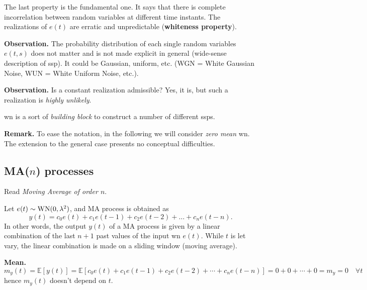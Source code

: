 The last property is the fundamental one. It says that there is complete incorrelation between random variables at different time instants. The realizations of $e(t)$ are erratic and unpredictable (\textbf{whiteness property}).


\textbf{Observation.} The probability distribution of each single random variables $e(t,s)$ does not matter and is not made explicit in general (wide-sense description of \gls{ssp}).
It could be Gaussian, uniform, etc. (WGN = White Gaussian Noise, WUN = White Uniform Noise, etc.).

\textbf{Observation.} Is a constant realization admissible? Yes, it is, but such a realization is \emph{highly unlikely}.

\gls{wn} is a sort of \emph{building block} to construct a number of different \glspl{ssp}.

\textbf{Remark.} To ease the notation, in the following we will consider \emph{zero mean} \gls{wn}. The extension to the general case presents no conceptual difficulties.

\subsection{MA(\texorpdfstring{$n$}{n}) processes}

Read \emph{Moving Average of order $n$}.

Let $e(t) \sim \operatorname{WN}(0, \lambda^{2})$, and MA process is obtained as
\[
	\boxed{y(t)=c_{0} e(t)+c_{1} e(t-1)+c_{2} e(t-2)+\ldots+c_{n} e(t-n).}
\]
In other words, the output $y(t)$ of a MA process is given by a linear combination of the last $n+1$ past values of the input \gls{wn} $e(t)$.
While $t$ is let vary, the linear combination is made on a sliding window (moving average).

\textbf{Mean.}
\[
	m_{y}(t)=\mathbb{E}[y(t)] = \mathbb{E}[c_{0} e(t)+c_{1} e(t-1)+c_{2} e(t-2)+\cdots+c_{n} e(t-n)] = 0+0+\cdots+0=m_{y}=0 \quad \forall t
\]
hence $m_{y}(t)$ doesn't depend on $t$.

